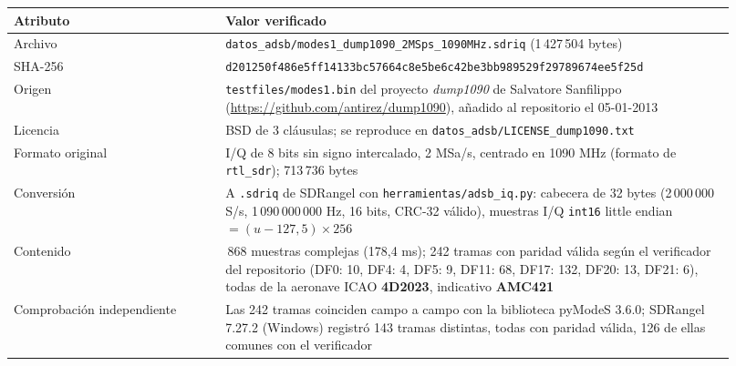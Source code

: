 \begin{longtable}{@{}>{\raggedright\arraybackslash}p{0.27\linewidth}>{\raggedright\arraybackslash}p{0.65\linewidth}@{}}
\toprule
\textbf{Atributo} & \textbf{Valor verificado} \\
\midrule
\endhead
Archivo & {\ttfamily\nolinkurl{datos_adsb/modes1_dump1090_2MSps_1090MHz.sdriq}} (1\,427\,504 bytes) \\
SHA-256 & {\ttfamily\small\nolinkurl{d201250f486e5ff14133bc57664c8e5be6c42be3bb989529f29789674ee5f25d}} \\
Origen & \texttt{testfiles/modes1.bin} del proyecto \emph{dump1090} de Salvatore Sanfilippo (\url{https://github.com/antirez/dump1090}), añadido al repositorio el 05-01-2013 \\
Licencia & BSD de 3 cláusulas; se reproduce en \texttt{datos\_adsb/LICENSE\_dump1090.txt} \\
Formato original & I/Q de 8 bits sin signo intercalado, 2 MSa/s, centrado en 1090 MHz (formato de \texttt{rtl\_sdr}); 713\,736 bytes \\
Conversión & A \texttt{.sdriq} de SDRangel con \texttt{herramientas/adsb\_iq.py}: cabecera de 32 bytes (2\,000\,000 S/s, 1\,090\,000\,000 Hz, 16 bits, CRC-32 válido), muestras I/Q \texttt{int16} little endian $= (u - 127{,}5)\times256$ \\
Contenido & 356\,868 muestras complejas (178,4 ms); 242 tramas con paridad válida según el verificador del repositorio (DF0: 10, DF4: 4, DF5: 9, DF11: 68, DF17: 132, DF20: 13, DF21: 6), todas de la aeronave ICAO \textbf{4D2023}, indicativo \textbf{AMC421} \\
Comprobación independiente & Las 242 tramas coinciden campo a campo con la biblioteca pyModeS 3.6.0; SDRangel 7.27.2 (Windows) registró 143 tramas distintas, todas con paridad válida, 126 de ellas comunes con el verificador \\
\bottomrule
\end{longtable}

